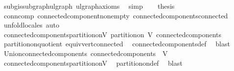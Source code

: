 \begin{isabellebody}
\ subg{\isachardot}{\kern0pt}is{\isacharunderscore}{\kern0pt}subgraph{\isacharunderscore}{\kern0pt}ulgraph\ ulgraph{\isacharunderscore}{\kern0pt}axioms\ \isamarkupfalse%
\ simp\isanewline
\ \ \isamarkupfalse%
\ {\isacharquery}{\kern0pt}thesis\ \isamarkupfalse%
\ conn{\isacharunderscore}{\kern0pt}comp\ connected{\isacharunderscore}{\kern0pt}component{\isacharunderscore}{\kern0pt}non{\isacharunderscore}{\kern0pt}empty\ connected{\isacharunderscore}{\kern0pt}components{\isacharunderscore}{\kern0pt}connected{}\ \isamarkupfalse%
\ {\isacharparenleft}{\kern0pt}unfold{\isacharunderscore}{\kern0pt}locales{\isacharcomma}{\kern0pt}\ auto{\isacharparenright}{\kern0pt}\isanewline
{}\isamarkupfalse%
%
\endisatagproof
{\isafoldproof}%
%
\isadelimproof
\isanewline
%
\endisadelimproof
\isanewline
{}\isamarkupfalse%
\ connected{\isacharunderscore}{\kern0pt}components{\isacharunderscore}{\kern0pt}partition{\isacharunderscore}{\kern0pt}on{\isacharunderscore}{\kern0pt}V{\isacharcolon}{\kern0pt}\ {\isachardoublequoteopen}partition{\isacharunderscore}{\kern0pt}on\ V\ connected{\isacharunderscore}{\kern0pt}components{\isachardoublequoteclose}\isanewline
%
\isadelimproof
\ \ %
\endisadelimproof
%
\isatagproof
{}\isamarkupfalse%
\ partition{\isacharunderscore}{\kern0pt}on{\isacharunderscore}{\kern0pt}quotient\ equiv{\isacharunderscore}{\kern0pt}vert{\isacharunderscore}{\kern0pt}connected\ \isamarkupfalse%
\ connected{\isacharunderscore}{\kern0pt}components{\isacharunderscore}{\kern0pt}def\ \isamarkupfalse%
\ blast%
\endisatagproof
{\isafoldproof}%
%
\isadelimproof
\isanewline
%
\endisadelimproof
\isanewline
{}\isamarkupfalse%
\ Union{\isacharunderscore}{\kern0pt}connected{\isacharunderscore}{\kern0pt}components{\isacharcolon}{\kern0pt}\ {\isachardoublequoteopen}{\isasymUnion}connected{\isacharunderscore}{\kern0pt}components\ {\isacharequal}{\kern0pt}\ V{\isachardoublequoteclose}\isanewline
%
\isadelimproof
\ \ %
\endisadelimproof
%
\isatagproof
{}\isamarkupfalse%
\ connected{\isacharunderscore}{\kern0pt}components{\isacharunderscore}{\kern0pt}partition{\isacharunderscore}{\kern0pt}on{\isacharunderscore}{\kern0pt}V\ \isamarkupfalse%
\ partition{\isacharunderscore}{\kern0pt}on{\isacharunderscore}{\kern0pt}def\ \isamarkupfalse%
\ blast%
\endisatagproof
{\isafoldproof}%
%
\isadelimproof
\isanewline
%
\endisadelimproof
\isanewline
{}\isamarkupfalse%

\end{isabellebody}
